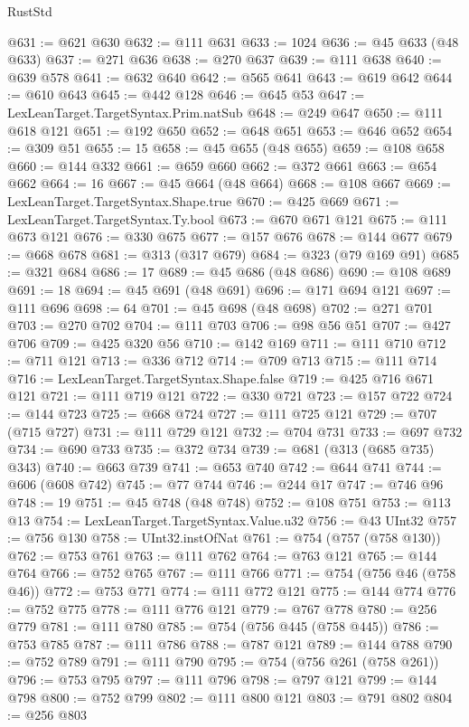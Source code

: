 \begin{lexlean}{RustStd}
\begin{coremodule}
@631 := @621 @630
@632 := @111 @631
@633 := 1024
@636 := @45 @633 (@48 @633)
@637 := @271 @636
@638 := @270 @637
@639 := @111 @638
@640 := @639 @578
@641 := @632 @640
@642 := @565 @641
@643 := @619 @642
@644 := @610 @643
@645 := @442 @128
@646 := @645 @53
@647 := LexLeanTarget.TargetSyntax.Prim.natSub
@648 := @249 @647
@650 := @111 @618 @121
@651 := @192 @650
@652 := @648 @651
@653 := @646 @652
@654 := @309 @51
@655 := 15
@658 := @45 @655 (@48 @655)
@659 := @108 @658
@660 := @144 @332
@661 := @659 @660
@662 := @372 @661
@663 := @654 @662
@664 := 16
@667 := @45 @664 (@48 @664)
@668 := @108 @667
@669 := LexLeanTarget.TargetSyntax.Shape.true
@670 := @425 @669
@671 := LexLeanTarget.TargetSyntax.Ty.bool
@673 := @670 @671 @121
@675 := @111 @673 @121
@676 := @330 @675
@677 := @157 @676
@678 := @144 @677
@679 := @668 @678
@681 := @313 (@317 @679)
@684 := @323 (@79 @169 @91)
@685 := @321 @684
@686 := 17
@689 := @45 @686 (@48 @686)
@690 := @108 @689
@691 := 18
@694 := @45 @691 (@48 @691)
@696 := @171 @694 @121
@697 := @111 @696
@698 := 64
@701 := @45 @698 (@48 @698)
@702 := @271 @701
@703 := @270 @702
@704 := @111 @703
@706 := @98 @56 @51
@707 := @427 @706
@709 := @425 @320 @56
@710 := @142 @169
@711 := @111 @710
@712 := @711 @121
@713 := @336 @712
@714 := @709 @713
@715 := @111 @714
@716 := LexLeanTarget.TargetSyntax.Shape.false
@719 := @425 @716 @671 @121
@721 := @111 @719 @121
@722 := @330 @721
@723 := @157 @722
@724 := @144 @723
@725 := @668 @724
@727 := @111 @725 @121
@729 := @707 (@715 @727)
@731 := @111 @729 @121
@732 := @704 @731
@733 := @697 @732
@734 := @690 @733
@735 := @372 @734
@739 := @681 (@313 (@685 @735) @343)
@740 := @663 @739
@741 := @653 @740
@742 := @644 @741
@744 := @606 (@608 @742)
@745 := @77 @744
@746 := @244 @17
@747 := @746 @96
@748 := 19
@751 := @45 @748 (@48 @748)
@752 := @108 @751
@753 := @113 @13
@754 := LexLeanTarget.TargetSyntax.Value.u32
@756 := @43 UInt32
@757 := @756 @130
@758 := UInt32.instOfNat
@761 := @754 (@757 (@758 @130))
@762 := @753 @761
@763 := @111 @762
@764 := @763 @121
@765 := @144 @764
@766 := @752 @765
@767 := @111 @766
@771 := @754 (@756 @46 (@758 @46))
@772 := @753 @771
@774 := @111 @772 @121
@775 := @144 @774
@776 := @752 @775
@778 := @111 @776 @121
@779 := @767 @778
@780 := @256 @779
@781 := @111 @780
@785 := @754 (@756 @445 (@758 @445))
@786 := @753 @785
@787 := @111 @786
@788 := @787 @121
@789 := @144 @788
@790 := @752 @789
@791 := @111 @790
@795 := @754 (@756 @261 (@758 @261))
@796 := @753 @795
@797 := @111 @796
@798 := @797 @121
@799 := @144 @798
@800 := @752 @799
@802 := @111 @800 @121
@803 := @791 @802
@804 := @256 @803

\end{coremodule}
\end{lexlean}
